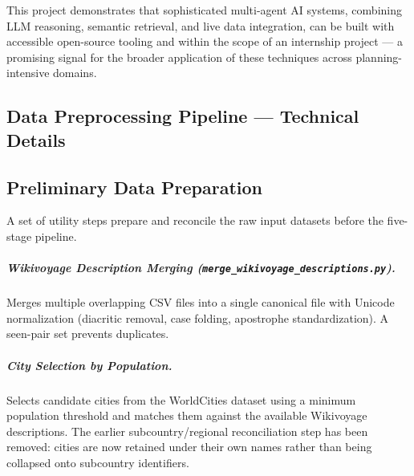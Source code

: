 \documentclass[12pt,a4paper]{report}
\begin{document}
This project demonstrates that sophisticated multi-agent AI systems, combining LLM reasoning,
semantic retrieval, and live data integration, can be built with accessible open-source tooling
and within the scope of an internship project — a promising signal for the broader application of
these techniques across planning-intensive domains.

\printbibliography[heading=bibintoc]

\begin{appendices}

\chapter{Data Preprocessing Pipeline — Technical Details}
\label{app:preprocessing}

\section{Preliminary Data Preparation}

A set of utility steps prepare and reconcile the raw input datasets before the five-stage pipeline.

\paragraph{Wikivoyage Description Merging (\texttt{merge\_wikivoyage\_descriptions.py}).}
Merges multiple overlapping CSV files into a single canonical file with Unicode normalization
(diacritic removal, case folding, apostrophe standardization). A seen-pair set prevents duplicates.

\paragraph{City Selection by Population.}
Selects candidate cities from the WorldCities dataset using a minimum population threshold and matches
them against the available Wikivoyage descriptions. The earlier subcountry/regional reconciliation
step has been removed: cities are now retained under their own names rather than being collapsed onto
subcountry identifiers.


\end{appendices}
\end{document}
